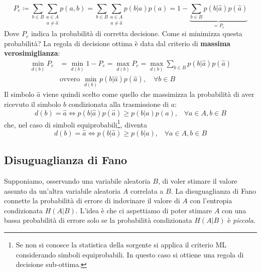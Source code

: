 \begin{equation}
    P_e \coloneqq \sum_{b \in B} \underset{a \neq \hat{a}}{\sum_{a \in A}} p(a,b) = \sum_{b \in B} \underset{a \neq \hat{a}}{\sum_{a \in A}} p(b|a) p(a) = 1 - \underbrace{\sum_{b \in B} p(b|\hat{a})p (\hat{a})}_{=P_c}
\end{equation}
Dove $P_c$ indica la probabilit\`a di corretta decisione. Come si minimizza questa probabilit\`a? La regola di decisione ottima \`e data dal criterio di \textbf{massima verosimiglianza}:
\begin{align*}
    \min_{d(b)} P_e &= \min_{d(b)} 1 - P_c = \max_{d(b)} P_c = \max_{d(b)} \sum_{b \in B} p(b|\hat{a})p (\hat{a})\\
    &\text{ovvero } \min_{d(b)} p(b|\hat{a})p (\hat{a}), \quad \forall b \in B
\end{align*}
Il simbolo $\hat{a}$ viene quindi scelto come quello che massimizza la probabilità di aver ricevuto il simbolo $b$ condizionata alla trasmissione di $a$:
\begin{equation}
    d(b) = \hat{a} \iff p(b|\hat{a}) p(\hat{a}) \geq p(b|a) p(a), \hspace{10pt} \forall a\in A, b\in B
\end{equation}
che, nel caso di simboli equiprobabili\footnote{Se non si conosce la statistica della sorgente si applica il criterio ML considerando simboli equiprobabili. In questo caso si ottiene una regola di decisione sub-ottima.}, diventa
\begin{equation}
   d(b) = \hat{a} \iff p(b|\hat{a}) \geq p(b|a), \hspace{10pt} \forall a\in A, b\in B
\end{equation}
\subsection{Disuguaglianza di Fano}
Supponiamo, osservando una variabile aleatoria $B$, di voler stimare il valore assunto da un'altra variabile aleatoria $A$ correlata a $B$. La disuguaglianza di Fano connette la probabilit\`a di errore di indovinare il valore di $A$ con l'entropia condizionata $H(A|B)$. L'idea \`e che ci aspettiamo di poter stimare $A$ con una bassa probabilit\`a di errore solo se la probabilit\`a condizionata $H(A|B)$ \`e \textit{piccola}.

